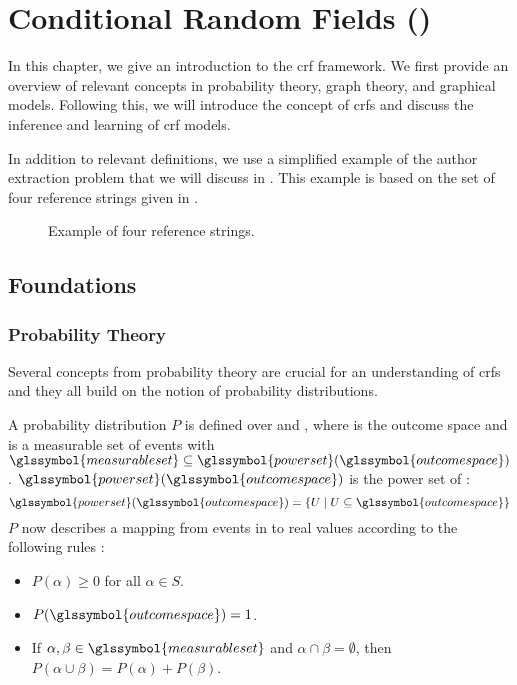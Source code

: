 \chapter{Conditional Random Fields ()}\label{cha:crfs}

In this chapter, we give an introduction to the \acrfull{crf} framework.
We first provide an overview of relevant concepts in probability theory, graph theory, and graphical models.
Following this, we will introduce the concept of \glspl{crf} and discuss the inference and learning of \gls{crf} models.

In addition to relevant definitions, we use a simplified example of the author extraction problem that we will discuss in .
This example is based on the set of four reference strings given in .

\begin{figure}[t]
\begin{framed}
  
\end{framed}
\caption{Example of four reference strings.}
\label{fig:example-reference-strings}
\end{figure}
\section{Foundations}\label{sec:foundations}
\subsection{Probability Theory}\label{subsec:probability-theory}
Several concepts from probability theory are crucial for an understanding of \glspl{crf} and they all build on the notion of \glspl{probability distribution}.

A \gls{probability distribution} $P$ is defined over  and , where  is the \gls{outcome space} and  is a \gls{measurable set} of \glspl{event} with $\glssymbol{measurable set}\subseteq \glssymbol{power set} (\glssymbol{outcome space})$ \citep{koller2009probabilistic}.
$\glssymbol{power set}(\glssymbol{outcome space})$ is the \gls{power set} of :
\begin{equation}
  \label{equ:power-set}
  \glssymbol{power set}(\glssymbol{outcome space})=\left\{U\mid U\subseteq \glssymbol{outcome space}\right\}
\end{equation}
$P$ now describes a mapping from events in  to real values according to the following rules \citep{koller2009probabilistic}:
\begin{itemize}
  \item $P(\alpha)\geq 0 $ for all $ \alpha \in S$.
  \item $P(\glssymbol{outcome space})=1$.
  \item If $\alpha,\beta\in \glssymbol{measurable set}$ and $\alpha\cap\beta = \emptyset$, then $P(\alpha\cup\beta)=P(\alpha)+P(\beta)$.
\end{itemize}


